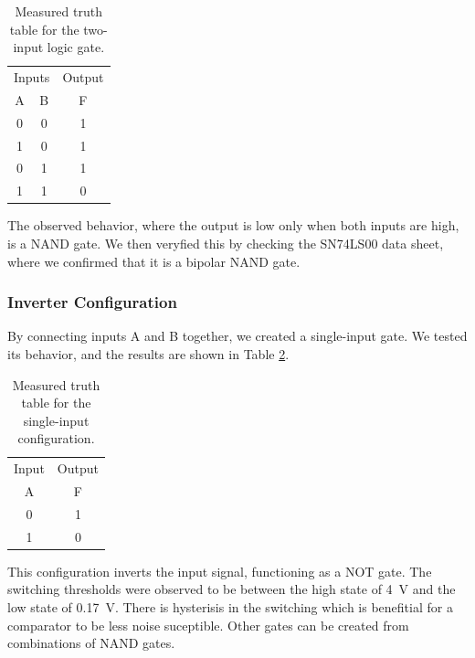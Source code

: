 \documentclass[12pt,a4paper]{article}
\begin{document}
\begin{table}[H]
    \centering
    \caption{Measured truth table for the two-input logic gate.}
    \begin{tabular}{cc|c}
        \toprule
        \multicolumn{2}{c|}{Inputs} & Output \\
        A & B & F \\
        \midrule
        0 & 0 & 1 \\
        1 & 0 & 1 \\
        0 & 1 & 1 \\
        1 & 1 & 0 \\
        \bottomrule
    \end{tabular}
    \label{tab:truth_table_nand}
\end{table}

The observed behavior, where the output is low only when both inputs are high, is a NAND gate. We then veryfied this by checking the SN74LS00 data sheet, where we confirmed that it is a bipolar NAND gate.

\subsubsection{Inverter Configuration}
By connecting inputs A and B together, we created a single-input gate. We tested its behavior, and the results are shown in Table \ref{tab:truth_table_not}.

\begin{table}[H]
    \centering
    \caption{Measured truth table for the single-input configuration.}
    \begin{tabular}{c|c}
        \toprule
        Input & Output \\
        A & F \\
        \midrule
        0 & 1 \\
        1 & 0 \\
        \bottomrule
    \end{tabular}
    \label{tab:truth_table_not}
\end{table}

This configuration inverts the input signal, functioning as a NOT gate. The switching thresholds were observed to be between the high state of \SI{4}{\volt} and the low state of \SI{0.17}{\volt}. There is hysterisis in the switching which is benefitial for a comparator to be less noise suceptible. Other gates can be created from combinations of NAND gates.
\end{document}
